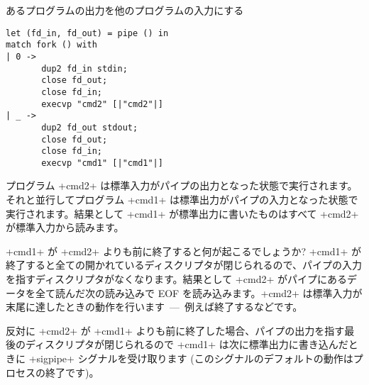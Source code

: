 \begin{example} %
あるプログラムの出力を他のプログラムの入力にする
%
\begin{lstlisting}
let (fd_in, fd_out) = pipe () in
match fork () with
| 0 ->
       dup2 fd_in stdin;
       close fd_out;
       close fd_in;
       execvp "cmd2" [|"cmd2"|]
| _ ->
       dup2 fd_out stdout;
       close fd_out;
       close fd_in;
       execvp "cmd1" [|"cmd1"|]
\end{lstlisting}
%
プログラム \ml+cmd2+ は標準入力がパイプの出力となった状態で実行されます。それと並行してプログラム \ml+cmd1+ は標準出力がパイプの入力となった状態で実行されます。結果として \ml+cmd1+ が標準出力に書いたものはすべて \ml+cmd2+ が標準入力から読みます。

\ml+cmd1+ が \ml+cmd2+ よりも前に終了すると何が起こるでしょうか? \ml+cmd1+ が終了すると全ての開かれているディスクリプタが閉じられるので、パイプの入力を指すディスクリプタがなくなります。結果として \ml+cmd2+ がパイプにあるデータを全て読んだ次の読み込みで EOF を読み込みます。\ml+cmd2+ は標準入力が末尾に達したときの動作を行います~---~例えば終了するなどです。


反対に \ml+cmd2+ が \ml+cmd1+ よりも前に終了した場合、パイプの出力を指す最後のディスクリプタが閉じられるので \ml+cmd1+ は次に標準出力に書き込んだときに \ml+sigpipe+ シグナルを受け取ります (このシグナルのデフォルトの動作はプロセスの終了です)。


\end{example}

